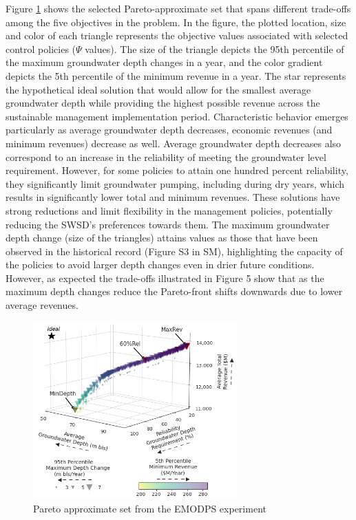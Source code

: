 \documentclass[a4paper,fleqn]{cas-sc}
\begin{document}
Figure \ref{fig:5} shows the selected Pareto-approximate set that spans different trade-offs among the five objectives in the problem. In the figure, the plotted location, size and color of each triangle represents the objective values associated with selected control policies ($\Psi$ values). The size of the triangle depicts the 95th percentile of the maximum groundwater depth changes in a year, and the color gradient depicts the 5th percentile of the minimum revenue in a year. The star represents the hypothetical ideal solution that would allow for the smallest average groundwater depth while providing the highest possible revenue across the sustainable management implementation period. Characteristic behavior emerges particularly as average groundwater depth decreases, economic revenues (and minimum revenues) decrease as well. Average groundwater depth decreases also correspond to an increase in the reliability of meeting the groundwater level requirement. However, for some policies to attain one hundred percent reliability, they significantly limit groundwater pumping, including during dry years, which results in significantly lower total and minimum revenues. These solutions have strong reductions and limit flexibility in the management policies, potentially reducing the SWSD's preferences towards them. The maximum groundwater depth change (size of the triangles) attains values as those that have been observed in the historical record (Figure S3 in SM), highlighting the capacity of the policies to avoid larger depth changes even in drier future conditions. However, as expected the trade-offs illustrated in Figure 5 show that as the maximum depth changes reduce the Pareto-front shifts downwards due to lower average revenues. 

\begin{figure}[htb!]
    \includegraphics[width=0.7\textwidth,center]{./figs/3d_plot.png}
    \caption{Pareto approximate set from the EMODPS experiment} \label{fig:5}
\end{figure}
\end{document}
